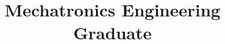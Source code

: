 \documentclass[11pt,a4paper,sans]{moderncv}
\title{Mechatronics Engineering Graduate}
\begin{document}
\makecvtitle












\end{document}
